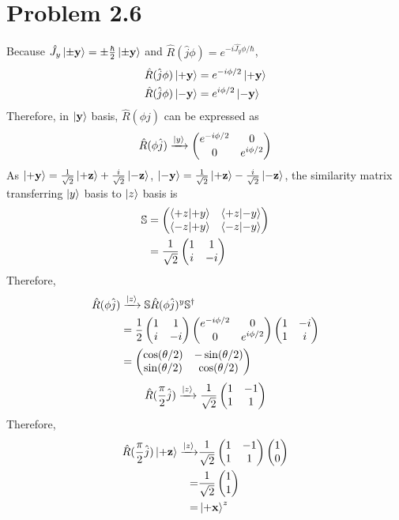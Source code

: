 \documentclass{article}
\begin{document}
\section*{Problem 2.6}
Because $\hat{J_y}\ket{\pm \vb{y}} = \pm \frac{\hbar}{2} \ket{\pm \vb{y}}$ and $\hat{R}(\hat{j}\phi)=e^{-i\hat{J_y}\phi/\hbar}$, 
\begin{align*}
  \hat{R}(\hat{j}\phi) \ket{\vb{+y}} &= e^{-i \phi/2} \ket{\vb{+y}} \\
  \hat{R}(\hat{j}\phi) \ket{\vb{-y}} &= e^{i \phi/2} \ket{\vb{-y}}
\end{align*}
Therefore, in $\ket{\vb{y}}$ basis, $\hat{R}(\phi \hat{j})$ can be expressed as
\begin{equation}
  \rot{j} \xrightarrow{\ket{y}} \pmqty{e^{-i \phi /2 }& 0 \\ 0 & e^{i \phi/2}}
\end{equation}
As $\ket{\vb{+y}} = \frac{1}{\sqrt{2}} \ket{\vb{+z}} + \frac{i}{\sqrt{2}} \ket{\vb{-z}}$, $\ket{\vb{-y}} = \frac{1}{\sqrt{2}} \ket{\vb{+z}} - \frac{i}{\sqrt{2}} \ket{\vb{-z}}$, the similarity matrix transferring $\ket{y}$ basis to $\ket{z}$ basis is 
\begin{equation} \nonumber
  \begin{split}
    \mathbb{S} &= \sm{+z}{-z}{+y}{-y} \\
    &= \frac{1}{\sqrt{2}}\pmqty{1 & 1 \\ i & -i}
  \end{split}
\end{equation}
Therefore,
\begin{equation*}
\begin{split}
\rot{j} &\xrightarrow{\ket{z}}
\mathbb{S} \rot{j}^{y} \mathbb{S}^{\dagger} \\
&= \frac{1}{2} \pmqty{1 & 1 \\ i & -i} \pmqty{e^{-i \phi /2 }& 0 \\ 0 & e^{i \phi/2}} \pmqty{1 & -i \\ 1 & i} \\
&= \pmqty{\cos(\theta/2) & -\sin(\theta/2) \\ \sin(\theta/2) & \cos(\theta/2)}
\end{split}
\end{equation*}
\[
  \rott{\frac{\pi}{2}}{j} \xrightarrow{\ket{z}} 
  \frac{1}{\sqrt{2}} \pmqty{1 & -1 \\ 1 & 1}
\]
Therefore,
\[
  \begin{split}
    \rott{\frac{\pi}{2}}{j} \pz \xrightarrow{\ket{z}}&
    \frac{1}{\sqrt{2}} \pmqty{1 & -1 \\ 1 & 1} \pmqty{1 \\ 0} \\
    =&\frac{1}{\sqrt{2}}  \pmqty{1 \\ 1} \\
    =&\px^{z}
  \end{split}
\]
\end{document}
